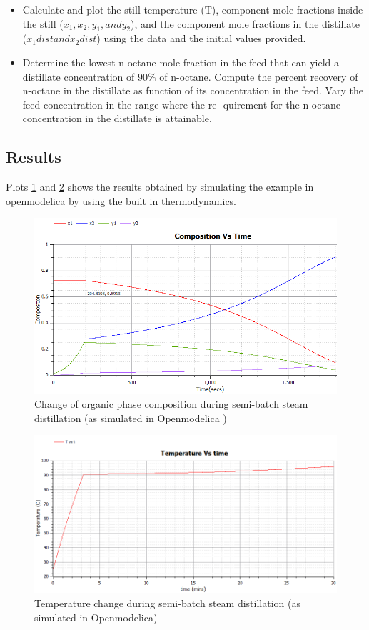 \documentclass[12pt]{report}
\begin{document}
\begin{itemize}
\item Calculate and plot the still temperature (T), component mole fractions inside the still ($x_1, x_2, y_1, and y_2$), and the component mole fractions in the distillate ($x_1dist and x_2dist$) using the data and the initial values provided.
\item Determine the lowest n-octane mole fraction in the
feed that can yield a distillate concentration of $90\%$ of n-octane. Compute the percent recovery of n-octane in the distillate as function of its concentration in the feed. Vary the feed concentration in the range where the re- quirement for the n-octane concentration in the distillate is attainable.
\end{itemize}

\subsection{Results}
Plots \ref{SD1} and \ref{SD2} shows the results obtained by simulating the example in openmodelica by using the built in thermodynamics. \\
\begin{figure}
\centering
\includegraphics[width=0.8\linewidth]{SD1}
\caption{Change of organic phase composition during semi-batch steam distillation (as simulated in Openmodelica )}
\label{SD1}
\end{figure}
\begin{figure}
\centering
\includegraphics[width=0.8\linewidth]{SD2}
\caption{Temperature change during semi-batch steam distillation (as simulated in Openmodelica)}
\label{SD2}
\end{figure}
\end{document}
